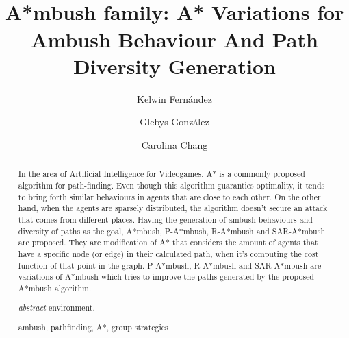 \documentclass[runningheads,a4paper]{llncs}
\newcommand{\keywords}[1]{\par\addvspace\baselineskip
\noindent\keywordname\enspace\ignorespaces#1}
\begin{document}
\mainmatter  %

\title{\ \\ \LARGE\bf A*mbush family: A* Variations for Ambush Behaviour
And Path Diversity Generation}


%
%

\author{Kelwin Fern\'{a}ndez\and Glebys Gonz\'{a}lez \and Carolina Chang}
%


%
%

\maketitle


\begin{abstract}
In the area of Artificial Intelligence for Videogames,
A* is a commonly proposed algorithm  for path-finding. 
Even though this algorithm guaranties optimality, it tends
to bring forth similar behaviours in agents that are
close to each other. On the other hand, when the agents
are sparsely distributed, the algorithm doesn’t secure an
attack that comes from different places. Having the
generation of ambush behaviours and diversity of paths
as the goal, A*mbush, P-A*mbush, R-A*mbush and SAR-A*mbush
are proposed. 
They are modification of A* that considers
the amount of agents that have a specific node
(or edge) in their calculated path, when it’s
computing the cost function of that point in
the graph. P-A*mbush, R-A*mbush and SAR-A*mbush
are variations of A*mbush which tries to improve
the paths generated by the proposed A*mbush algorithm.

\emph{abstract} environment.
\keywords{ambush, pathfinding, A*, group strategies}
\end{abstract}











%


\end{document}
